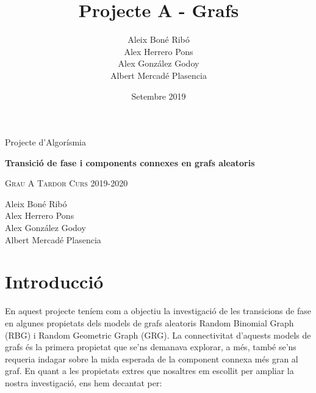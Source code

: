 



%

\title{Projecte A - Grafs}
\author{
Aleix Boné Ribó\\
Alex Herrero Pons\\
Alex González Godoy\\
Albert Mercadé Plasencia\\
}
\date{Setembre 2019}



\thispagestyle{empty}
\clearpage
\setcounter{page}{-1}

\begin{titlepage}
{
    \centering
    \null
    \vfill
    {\Large Projecte d'Algorísmia\par}
    \vspace{2em}
    {\Huge \bfseries 
    Transició de fase i components connexes en grafs aleatoris
    \par}
    \vspace{2em}
    {\large \scshape 
    Grau A \qquad Tardor Curs 2019-2020
    \par}
    \vfill
\begin{center}
    
\end{center}
    \vspace{3cm}

    \vfill
    {\raggedleft \large
Aleix Boné Ribó\\
Alex Herrero Pons\\
Alex González Godoy\\
Albert Mercadé Plasencia\\
        \par}
}
\end{titlepage}

\pagebreak
{} 

\tableofcontents
\pagebreak
{} 

\section{Introducció}
En aquest projecte teníem com a objectiu la investigació de les transicions de fase en algunes propietats dels models de grafs aleatoris Random Binomial Graph (RBG) i Random Geometric Graph (GRG). La connectivitat d'aquests models de grafs és la primera propietat que se'ns demanava explorar, a més, també se'ns requeria indagar sobre la mida esperada de la component connexa més gran al graf. En quant a les propietats extres que nosaltres em escollit per ampliar la nostra investigació, ens hem decantat per:

